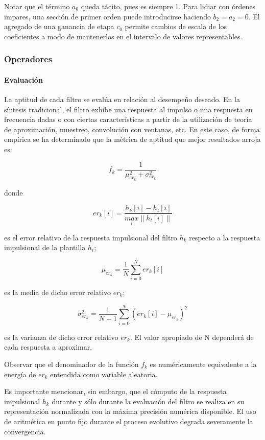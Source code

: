 \documentclass[11pt, journal]{IEEEtran}
\begin{document}
    Notar que el término \(a_0\) queda tácito, pues es siempre 1. Para
lidiar con órdenes impares, una sección de primer orden puede
introducirse haciendo \(b_2 = a_2 = 0\). El agregado de una ganancia de
etapa \(c_0\) permite cambios de escala de los coeficientes a modo de
mantenerlos en el intervalo de valores representables.

\subsubsection{Operadores}

\paragraph{Evaluación}

La aptitud de cada filtro se evalúa en relación al desempeño deseado. En
la síntesis tradicional, el filtro exhibe una respuesta al impulso o una
respuesta en frecuencia dadas o con ciertas características a partir de
la utilización de teoría de aproximación, muestreo, convolución con
ventanas, etc. En este caso, de forma empírica se ha determinado que la
métrica de aptitud que mejor resultados arroja es:

\[
f_k = \frac{1}{\mu_{er_k}^2 + \sigma_{er_k}^2}
\]

donde

\[
er_k[i] = \frac{h_k[i] - h_t[i]}{\underset{i}{max} \|h_t[i]\|}
\]

es el error relativo de la respuesta impulsional del filtro \(h_k\)
respecto a la respuesta impulsional de la plantilla \(h_t\);

\[
\mu_{er_k} = \frac{1}{N} \sum^N_{i = 0} er_k[i]
\]

es la media de dicho error relativo \(er_k\);

\[
\sigma^2_{er_k} = \frac{1}{N - 1} \sum^N_{i = 0} (er_k[i] - \mu_{er_k})^2
\]

es la varianza de dicho error relativo \(er_k\). El valor apropiado de N
dependerá de cada respuesta a aproximar.

Observar que el denominador de la función \(f_k\) es numéricamente
equivalente a la energía de \(er_k\) entendida como variable aleatoria.

Es importante mencionar, sin embargo, que el cómputo de la respuesta
impulsional \(h_k\) durante y sólo durante la evaluación del filtro se
realiza en su representación normalizada con la máxima precisión
numérica disponible. El uso de aritmética en punto fijo durante el
proceso evolutivo degrada severamente la convergencia.
\end{document}
